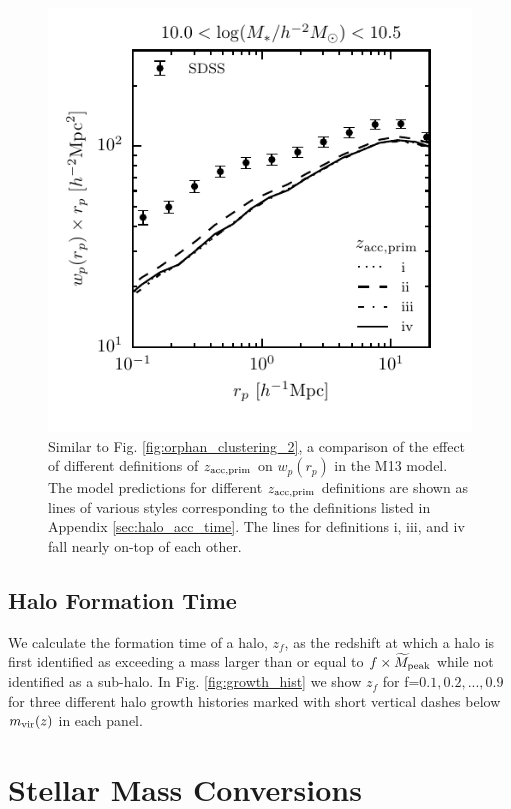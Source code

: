 \documentclass[useAMS,fleqn,usenatbib]{mnras}
\begin{document}
%
\begin{figure}
\includegraphics[width=\columnwidth]{figures/wp_comparison_zacc_prime_2.pdf}
\caption{Similar to Fig. \ref{fig:orphan_clustering_2}, a comparison of the effect of different definitions of $z_{\rm acc, prim}$ on $w_p(r_p)$ in the M13 model.  The model predictions for different $z_{\rm acc, prim}$ definitions are shown as lines of various styles corresponding to the definitions listed in Appendix \ref{sec:halo_acc_time}.  The lines for definitions i, iii, and iv fall nearly on-top of each other.}
\label{fig:zacc_wp_comp}
\end{figure}
%

\subsection{Halo Formation Time}

We calculate the formation time of a halo, $z_{f}$, as the redshift at which a halo is first identified as exceeding a mass larger than or equal to $f \times \widetilde{M}_{\rm peak}$ while not identified as a sub-halo.  In Fig. \ref{fig:growth_hist} we show $z_f$ for f=$0.1,0.2,...,0.9$ for three different halo growth histories marked with short vertical dashes below $m_{\rm vir}(z)$ in each panel.     

\section{Stellar Mass Conversions}
\label{appendix:stellar_mass_conv}
\end{document}

